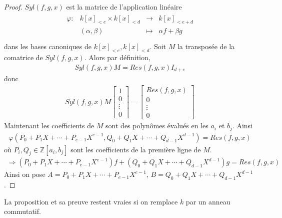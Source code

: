             \begin{proof}
                $Syl(f,g,x)$ est la matrice de l'application linéaire 
                \begin{align*}
                    \begin{array}{cccc}
                        \varphi : & k[x]_{<e} \times k[x]_{<d} & \to & k[x]_{<e + d}\\
                        & (\alpha, \beta) & \mapsto & \alpha f + \beta g \\
                    \end{array}
                \end{align*}
                dans les bases canoniques de $k[x]_{<e}, k[x]_{<d}$. Soit $M$ la transposée de la comatrice de $Syl(f,g,x)$. Alors par définition,
                \begin{align*}
                    Syl(f,g,x) M = Res(f,g,x) I_{d+e}
                \end{align*}
                donc
                \begin{align*}
                    Syl(f,g,x) M \begin{bmatrix} 1 \\ 0 \\ \vdots \\ 0 \end{bmatrix} = \begin{bmatrix} Res(f,g,x) \\ 0 \\ \vdots \\ 0 \end{bmatrix}
                \end{align*}
                Maintenant les coefficients de $M$ sont des polynômes évalués en les $a_i$ et $b_j$. Ainsi
                \begin{align*}
                    \varphi(P_0 + P_1X + \cdots + P_{e-1}X^{e-1}, Q_0 + Q_1X + \cdots + Q_{d-1}X^{d-1}) = Res(f,g,x)
                \end{align*}
                où $P_i, Q_j \in \mathbb{Z}[a_i, b_j]$ sont les coefficients de la première ligne de $M$.
                \begin{align*}
                    \Rightarrow (P_0 + P_1X + \cdots + P_{e-1}X^{e-1}) f + (Q_0 + Q_1X + \cdots + Q_{d-1}X^{d-1}) g = Res(f,g,x)
                \end{align*}
                Ainsi on pose $A = P_0 + P_1X + \cdots + P_{e-1}X^{e-1}$, $B = Q_0 + Q_1X + \cdots + Q_{d-1}X^{d-1}$.
            \end{proof}
            \begin{remq}
                La proposition et sa preuve restent vraies si on remplace $k$ par un anneau commutatif.
            \end{remq}
        
